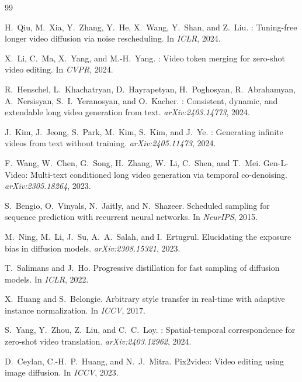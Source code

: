 \documentclass[12pt]{article}
\begin{document}

\begin{thebibliography}{99}

H.~Qiu, M.~Xia, Y.~Zhang, Y.~He, X.~Wang, Y.~Shan, and Z.~Liu.
: Tuning-free longer video diffusion via noise rescheduling.
\newblock In \emph{ICLR}, 2024.

X.~Li, C.~Ma, X.~Yang, and M.-H.~Yang.
: Video token merging for zero-shot video editing.
\newblock In \emph{CVPR}, 2024.

R.~Henschel, L.~Khachatryan, D.~Hayrapetyan, H.~Poghosyan, R.~Abrahamyan,
A.~Nersisyan, S.~I.~Yeranosyan, and O.~Kacher.
: Consistent, dynamic, and extendable long video generation from text.
\newblock \emph{arXiv:2403.14773}, 2024.

J.~Kim, J.~Jeong, S.~Park, M.~Kim, S.~Kim, and J.~Ye.
: Generating infinite videos from text without training.
\newblock \emph{arXiv:2405.11473}, 2024.

F.~Wang, W.~Chen, G.~Song, H.~Zhang, W.~Li, C.~Shen, and T.~Mei.
\newblock Gen-{L}-Video: Multi-text conditioned long video generation via temporal co-denoising.
\newblock \emph{arXiv:2305.18264}, 2023.

S.~Bengio, O.~Vinyals, N.~Jaitly, and N.~Shazeer.
\newblock Scheduled sampling for sequence prediction with recurrent neural networks.
\newblock In \emph{NeurIPS}, 2015.

M.~Ning, M.~Li, J.~Su, A.~A.~Salah, and I.~Ertugrul.
\newblock Elucidating the exposure bias in diffusion models.
\newblock \emph{arXiv:2308.15321}, 2023.

T.~Salimans and J.~Ho.
\newblock Progressive distillation for fast sampling of diffusion models.
\newblock In \emph{ICLR}, 2022.

X.~Huang and S.~Belongie.
\newblock Arbitrary style transfer in real-time with adaptive instance normalization.
\newblock In \emph{ICCV}, 2017.

S.~Yang, Y.~Zhou, Z.~Liu, and C.~C.~Loy.
: Spatial-temporal correspondence for zero-shot video translation.
\newblock \emph{arXiv:2403.12962}, 2024.

D.~Ceylan, C.-H.~P.~Huang, and N.~J.~Mitra.
\newblock Pix2video: Video editing using image diffusion.
\newblock In \emph{ICCV}, 2023.

\end{thebibliography}
\end{document}
